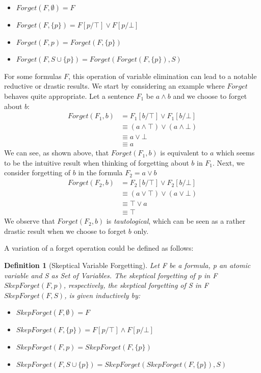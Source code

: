 \documentclass[f,proposal,palatino]{AIGpaper}
\newtheorem{definition}{Definition}
\begin{document}
\begin{itemize}
  \item $\mathit{Forget(F,\emptyset)} = F$ 
  \item $\mathit{Forget(F,\{p\})} = F[p/\top] \lor F[p/\bot]$
  \item $\mathit{Forget}(F,p) = \mathit{Forget}(F,\{p\})$
  \item $\mathit{Forget(F,S \cup \{p\})} = \mathit{Forget(Forget(F,\{p\}), S)}$
\end{itemize}
For some formulas $F$, this operation of variable elimination can lead to a notable reductive or drastic results. We start by considering an example where $\mathit{Forget}$ behaves quite appropriate. Let a sentence $F_1$ be $a \land b$ and we choose to forget about $b$:
\begin{align*}
\mathit{Forget(F_1,b)} &= F_1[b/\top] \lor F_1[b/\bot] \\ 
&\equiv (a \land \top) \lor (a \land \bot) \\ 
&\equiv a \lor \bot \\ 
&\equiv a
\end{align*}
We can see, as shown above, that $\mathit{Forget(F_1,b)}$ is equivalent to $a$ which seems to be the intuitive result when thinking of forgetting about $b$ in $F_1$. Next, we consider forgetting of $b$ in the formula $F_2 = a \lor b$
\begin{align*}
    \mathit{Forget(F_2,b)} &= F_2[b/\top] \lor F_2[b/\bot] \\ 
    &\equiv (a \lor \top) \lor (a \lor \bot) \\ 
    &\equiv \top \lor a \\ 
    &\equiv \top 
\end{align*}
We observe that $\mathit{Forget(F_2,b)}$ is \emph{tautological}, which can be seen as a rather drastic result when we choose to forget $b$ only.

A variation of a forget operation could be defined as follows:
    \begin{definition}[Skeptical Variable Forgetting]
    Let F be a formula, p an atomic variable and S as Set of Variables. The \emph{skeptical forgetting of p in F $\mathit{SkepForget}(F,p)$}, respectively, the \emph{skeptical forgetting of S in F} $\mathit{SkepForget(F,S)}$, is given inductively by:
    \end{definition}
        
    \begin{itemize}
      \item $\mathit{SkepForget(F,\emptyset)} = F$
      \item $\mathit{SkepForget(F,\{p\})} = F[p/\top] \land F[p/\bot]$
        \item $\mathit{SkepForget}(F,p) = \mathit{SkepForget}(F,\{p\})$
      \item $\mathit{SkepForget(F,S \cup \{p\})} = \mathit{SkepForget(SkepForget(F,\{p\}), S)}$
    \end{itemize}
\end{document}
